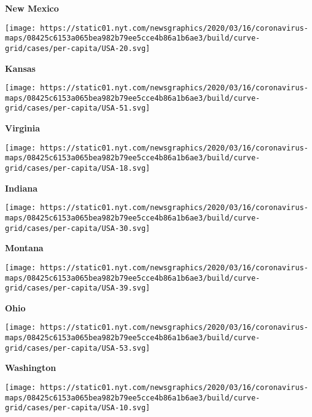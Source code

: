 \textbf{New Mexico}

\href{https://www.nytimes.com/interactive/2020/us/kansas-coronavirus-cases.html}{}

\texttt{[image: https://static01.nyt.com/newsgraphics/2020/03/16/coronavirus-maps/08425c6153a065bea982b79ee5cce4b86a1b6ae3/build/curve-grid/cases/per-capita/USA-20.svg]}

\textbf{Kansas}

\href{https://www.nytimes.com/interactive/2020/us/virginia-coronavirus-cases.html}{}

\texttt{[image: https://static01.nyt.com/newsgraphics/2020/03/16/coronavirus-maps/08425c6153a065bea982b79ee5cce4b86a1b6ae3/build/curve-grid/cases/per-capita/USA-51.svg]}

\textbf{Virginia}

\href{https://www.nytimes.com/interactive/2020/us/indiana-coronavirus-cases.html}{}

\texttt{[image: https://static01.nyt.com/newsgraphics/2020/03/16/coronavirus-maps/08425c6153a065bea982b79ee5cce4b86a1b6ae3/build/curve-grid/cases/per-capita/USA-18.svg]}

\textbf{Indiana}

\href{https://www.nytimes.com/interactive/2020/us/montana-coronavirus-cases.html}{}

\texttt{[image: https://static01.nyt.com/newsgraphics/2020/03/16/coronavirus-maps/08425c6153a065bea982b79ee5cce4b86a1b6ae3/build/curve-grid/cases/per-capita/USA-30.svg]}

\textbf{Montana}

\href{https://www.nytimes.com/interactive/2020/us/ohio-coronavirus-cases.html}{}

\texttt{[image: https://static01.nyt.com/newsgraphics/2020/03/16/coronavirus-maps/08425c6153a065bea982b79ee5cce4b86a1b6ae3/build/curve-grid/cases/per-capita/USA-39.svg]}

\textbf{Ohio}

\href{https://www.nytimes.com/interactive/2020/us/washington-coronavirus-cases.html}{}

\texttt{[image: https://static01.nyt.com/newsgraphics/2020/03/16/coronavirus-maps/08425c6153a065bea982b79ee5cce4b86a1b6ae3/build/curve-grid/cases/per-capita/USA-53.svg]}

\textbf{Washington}

\href{https://www.nytimes.com/interactive/2020/us/delaware-coronavirus-cases.html}{}

\texttt{[image: https://static01.nyt.com/newsgraphics/2020/03/16/coronavirus-maps/08425c6153a065bea982b79ee5cce4b86a1b6ae3/build/curve-grid/cases/per-capita/USA-10.svg]}

